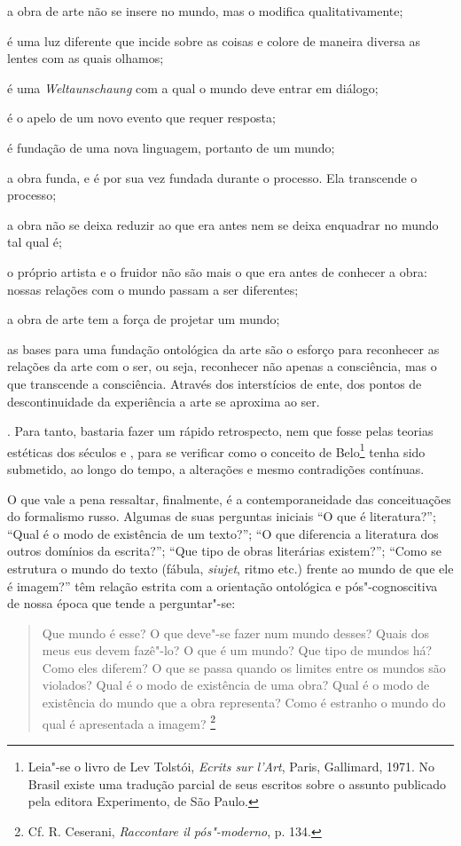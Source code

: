 {{  a obra de arte não se insere no mundo, mas o modifica
  qualitativamente;

  é uma luz diferente que incide sobre as coisas e colore de maneira
  diversa as lentes com as quais olhamos;

  é uma \emph{Weltaunschaung} com a qual o mundo deve entrar em diálogo;

  é o apelo de um novo evento que requer resposta;

  é fundação de uma nova linguagem, portanto de um mundo;

  a obra funda, e é por sua vez fundada durante o processo. Ela
  transcende o processo;

  a obra não se deixa reduzir ao que era antes nem se deixa enquadrar no
  mundo tal qual é;

  o próprio artista e o fruidor não são mais o que era antes de
  conhecer a obra: nossas relações com o mundo passam a ser diferentes;

  a obra de arte tem a força de projetar um mundo;

  as bases para uma fundação ontológica da arte são o esforço para
  reconhecer as relações da arte com o ser, ou seja, reconhecer não
  apenas a consciência, mas o que transcende a consciência. Através dos
  interstícios de ente, dos pontos de descontinuidade da experiência a
  arte se aproxima ao ser.}. Para tanto, bastaria fazer um rápido
retrospecto, nem que fosse pelas teorias estéticas dos séculos  e ,
para se verificar como o conceito de Belo\footnote{Leia"-se o livro de
  Lev Tolstói, \emph{Ecrits sur l'Art}, Paris, Gallimard, 1971. No
  Brasil existe uma tradução parcial de seus escritos sobre o assunto
  publicado pela editora Experimento, de São Paulo.} tenha sido
submetido, ao longo do tempo, a alterações e mesmo contradições
contínuas.

O que vale a pena ressaltar, finalmente, é a contemporaneidade das
conceituações do formalismo russo. Algumas de suas perguntas iniciais
``O que é literatura?''; ``Qual é o modo de existência de um texto?'';
``O que diferencia a literatura dos outros domínios da escrita?''; ``Que
tipo de obras literárias existem?''; ``Como se estrutura o mundo do
texto (fábula, \emph{siujet}, ritmo etc.) frente ao mundo de que ele é
imagem?'' têm relação estrita com a orientação ontológica e
pós"-cognoscitiva de nossa época que tende a perguntar"-se:

\begin{quote}
Que mundo é esse? O que deve"-se fazer num mundo desses? Quais dos meus
eus devem fazê"-lo? O que é um mundo? Que tipo de mundos há? Como eles
diferem? O que se passa quando os limites entre os mundos são violados?
Qual é o modo de existência de uma obra? Qual é o modo de existência do
mundo que a obra representa? Como é estranho o mundo do qual é
apresentada a imagem? \footnote{Cf. R. Ceserani, \emph{Raccontare il
  pós"-moderno}, p. 134.}
\end{quote}

}
